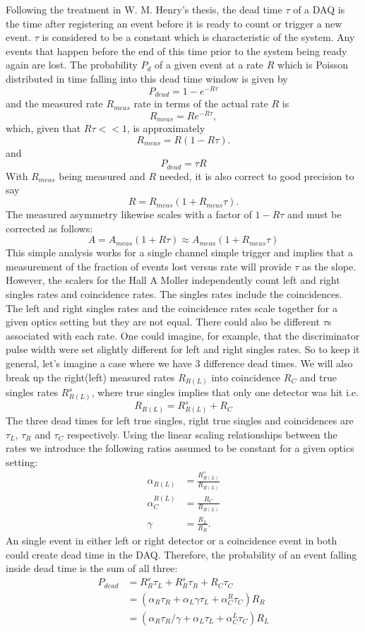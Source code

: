 \documentclass[12pt]{article}
\begin{document}
Following the treatment in W. M. Henry's thesis, the dead time $\tau$ of a DAQ is the time after registering an event before it is ready to count or trigger a new event. $\tau$ is considered to be a constant which is characteristic of the system. Any events that happen before the end of this time prior to the system being ready again are lost. The probability $P_d$ of a given event at a rate $R$ which is Poisson distributed in time falling into this dead time window is given by
\[
P_{dead} = 1-e^{-R\tau}
\]
and the measured rate $R_{meas}$ rate  in terms of the actual rate $R$ is
\[
R_{meas}=Re^{-R\tau},
\]
which, given that $R\tau<<1$, is approximately
\[
R_{meas}=R(1-R\tau).
\]
and 
\begin{equation}
P_{dead}=\tau R
\label{eq:pdead}
\end{equation}
With $R_{meas}$ being measured and $R$ needed, it is also correct to good precision to say
\[
R=R_{meas}(1+R_{meas}\tau).
\]
The measured asymmetry likewise scales with a factor of $1-R\tau$ and must be corrected as follows:
\[A=A_{meas}(1+R\tau)\approx A_{meas}(1+R_{meas}\tau)
\]
This simple analysis works for a single channel simple trigger and implies that a measurement of the fraction of events lost versus rate will provide $\tau$ as the slope. However, the scalers for the Hall A Moller independently count left and right singles rates and coincidence rates. The singles rates include the coincidences. The left and right singles rates and the coincidence rates scale together for a given optics setting but they are not equal. There could also be different $\tau$s associated with each rate. One could imagine, for example, that the discriminator pulse width were set slightly different for left and right singles rates. So to keep it general, let's imagine a case where we have 3 difference dead times. We will also break up the right(left) measured rates $R_{R(L)}$ into coincidence $R_C$  and true singles rates $R^s_{R(L)}$, where true singles implies that only one detector was hit i.e.
\begin{equation}
R_{R(L)}=R^s_{R(L)}+R_C
\end{equation}
The three dead times for left true singles, right true singles and coincidences are $\tau_L$, $\tau_R$ and $\tau_C$ respectively. Using the linear scaling relationships between the rates we introduce the following ratios assumed to be constant for a given optics setting:
\begin{align}
\alpha_{R(L)}&=\frac{R^s_{R(L)}}{R_{R(L)}} \\
\alpha_C^{R(L)}&=\frac{R_C}{R_{R(L)}}\\
\gamma&=\frac{R_L}{R_R}.
\end{align} 
An single event in either left or right detector or a coincidence event in both could create dead time in the DAQ. Therefore, the probability of an event falling inside dead time is the sum of all three:
\begin{align}
P_{dead}&=R^s_R\tau_L+R^s_R\tau_R+R_C\tau_C\\
&=\left(\alpha_R\tau_R+\alpha_L\gamma\tau_L+\alpha_C^R\tau_C\right)R_R\\
&=\left(\alpha_R\tau_R/\gamma+\alpha_L\tau_L+\alpha^L_C\tau_C\right)R_L
\end{align}
\end{document}
